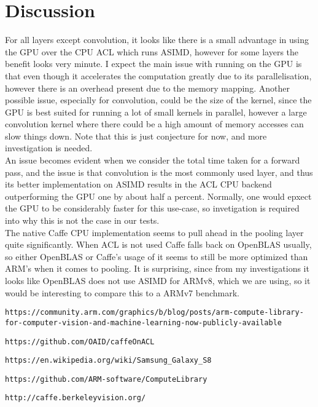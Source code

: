 \documentclass[12pt, a4paper, notitlepage]{report}
\begin{document}
\section*{Discussion}
For all layers except convolution, it looks like there is a small advantage in using the GPU over the CPU ACL which runs ASIMD, however for some layers the benefit looks very minute. I expect the main issue with running on the GPU is that even though it accelerates the computation greatly due to its parallelisation, however there is an overhead present due to the memory mapping. Another possible issue, especially for convolution, could be the size of the kernel, since the GPU is best suited for running a lot of small kernels in parallel, however a large convolution kernel where there could be a high amount of memory accesses can slow things down. Note that this is just conjecture for now, and more investigation is needed.\\
An issue becomes evident when we consider the total time taken for a forward pass, and the issue is that convolution is the most commonly used layer, and thus its better implementation on ASIMD results in the ACL CPU backend outperforming the GPU one by about half a percent. Normally, one would epxect the GPU to be considerably faster for this use-case, so invetigation is required into why this is not the case in our tests.\\
The native Caffe CPU implementation seems to pull ahead in the pooling layer quite significantly. When ACL is not used Caffe falls back on OpenBLAS usually, so either OpenBLAS or Caffe's usage of it seems to still be more optimized than ARM's when it comes to pooling. It is surprising, since from my investigations it looks like OpenBLAS does not use ASIMD for ARMv8, which we are using, so it would be interesting to compare this to a ARMv7 benchmark.

\medskip

\begin{thebibliography}{9}

\begin{lstlisting}[breaklines,basicstyle=\ttfamily]
https://community.arm.com/graphics/b/blog/posts/arm-compute-library-for-computer-vision-and-machine-learning-now-publicly-available
\end{lstlisting}

\texttt{https://github.com/OAID/caffeOnACL}

\texttt{https://en.wikipedia.org/wiki/Samsung\_Galaxy\_S8}

\texttt{https://github.com/ARM-software/ComputeLibrary}

\texttt{http://caffe.berkeleyvision.org/}

\end{thebibliography}
\end{document}
